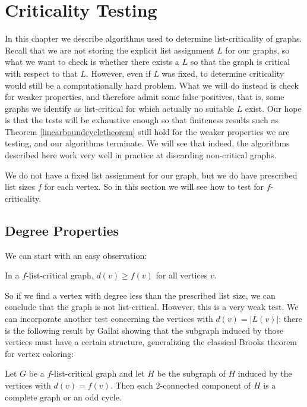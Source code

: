 \chapter{Criticality Testing}

In this chapter we describe algorithms used to determine list-criticality of graphs. Recall that we are 
not storing the explicit list assignment $L$ for our graphs, so what we want to check is whether there 
exists a $L$ so that the graph is critical with respect to that $L$. However, even if $L$ was fixed, 
to determine criticality would still be a computationally hard problem. What we will do instead is check 
for weaker properties, and therefore admit some false positives, that is, some graphs we identify as list-critical 
for which actually no suitable $L$ exist. Our hope is that the tests will be exhaustive enough so that finiteness 
results such as Theorem \ref{linearboundcycletheorem} still hold for the weaker properties we are testing, and our algorithms 
terminate. We will see that indeed, the algorithms described here work very well in practice at discarding non-critical graphs. 

We do not have a fixed list assignment for our graph, but we do have prescribed list sizes $f$ for each
vertex. So in this section we will see how to test for $f$-criticality. 

\section{Degree Properties}

We can start with an easy observation:

\begin{observation}
\label{degreeobs}
In a $f$-list-critical graph, $d(v) \geq f(v)$ for all vertices $v$.
\end{observation}

So if we find a vertex with degree less than the prescribed list size, we can conclude that the graph is not list-critical. 
However, this is a very weak test. We can incorporate another test concerning the vertices with $d(v) = |L(v)|$: there is
the following result by Gallai showing that the subgraph induced by those vertices must have a certain structure, generalizing 
the classical Brooks theorem for vertex coloring:

\begin{theorem}
Let $G$ be a $f$-list-critical graph and let $H$ be the subgraph
of $H$ induced by the vertices with $d(v) = f(v)$. 
Then each $2$-connected component of $H$ is a complete graph or an odd cycle.
\end{theorem}

